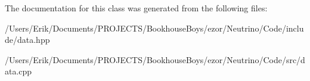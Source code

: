The documentation for this class was generated from the following files\+:\begin{DoxyCompactItemize}
\item 
/\+Users/\+Erik/\+Documents/\+P\+R\+O\+J\+E\+C\+T\+S/\+Bookhouse\+Boys/ezor/\+Neutrino/\+Code/include/data.\+hpp\item 
/\+Users/\+Erik/\+Documents/\+P\+R\+O\+J\+E\+C\+T\+S/\+Bookhouse\+Boys/ezor/\+Neutrino/\+Code/src/data.\+cpp\end{DoxyCompactItemize}
